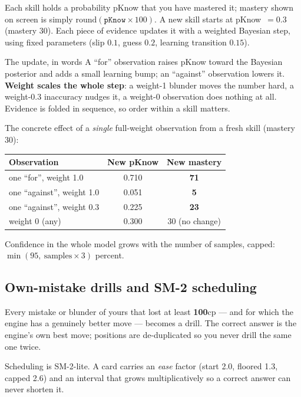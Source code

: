 \documentclass[11pt]{article}
\newcommand{\code}[1]{{\ttfamily #1}}
\begin{document}
Each skill holds a probability \code{pKnow} that you have mastered it; mastery
shown on screen is simply $\text{round}(\mathtt{pKnow}\times 100)$. A new skill
starts at \code{pKnow}~$=0.3$ (mastery 30). Each piece of evidence updates it
with a weighted Bayesian step, using fixed parameters (slip $0.1$, guess $0.2$,
learning transition $0.15$).

\begin{rulebox}{The update, in words}
A ``for'' observation raises \code{pKnow} toward the Bayesian posterior and adds
a small learning bump; an ``against'' observation lowers it. \textbf{Weight
scales the whole step}: a weight-1 blunder moves the number hard, a weight-0.3
inaccuracy nudges it, a weight-0 observation does nothing at all. Evidence is
folded in sequence, so order within a skill matters.
\end{rulebox}

The concrete effect of a \emph{single} full-weight observation from a fresh
skill (mastery 30):

\begin{center}
\tabnum
\begin{tabularx}{\linewidth}{@{}Y c c@{}}
\toprule
\textbf{Observation} & \textbf{New \code{pKnow}} & \textbf{New mastery} \\
\midrule
one ``for'', weight 1.0 & 0.710 & \textbf{71} \\
one ``against'', weight 1.0 & 0.051 & \textbf{5} \\
one ``against'', weight 0.3 & 0.225 & \textbf{23} \\
weight 0 (any) & 0.300 & 30 (no change) \\
\bottomrule
\end{tabularx}
\end{center}

Confidence in the whole model grows with the number of samples, capped:
$\min(95,\ \text{samples}\times 3)$ percent.

\subsection{Own-mistake drills and SM-2 scheduling}

Every mistake or blunder of yours that lost at least \textbf{100}cp --- and for
which the engine has a genuinely better move --- becomes a drill. The correct
answer is the engine's own best move; positions are de-duplicated so you never
drill the same one twice.

Scheduling is SM-2-lite. A card carries an \emph{ease} factor (start 2.0,
floored 1.3, capped 2.6) and an interval that grows multiplicatively so a
correct answer can never shorten it.
\end{document}

